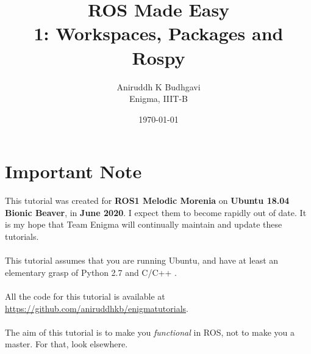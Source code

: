 \documentclass{article}
\title{ROS Made Easy \\1: Workspaces, Packages and Rospy}
\date{\today}
\author{Aniruddh K Budhgavi \\Enigma, IIIT-B}
\begin{document}
    \maketitle
    \section{Important Note}
    This tutorial was created for \textbf{ROS1 Melodic Morenia}
    on \textbf{Ubuntu 18.04 Bionic Beaver}, in \textbf{June 2020}.
    I expect them to become rapidly out of date. It is my hope
    that Team Enigma will continually maintain and update these tutorials.
    \\
    \\
    This tutorial assumes that you are running Ubuntu, and have at least an
    elementary grasp of Python 2.7 and C/C++ .
    \\
    \\
    All the code for this tutorial is available at \url{https://github.com/aniruddhkb/enigmatutorials}.
    \\
    \\
    The aim of this tutorial is to make you \emph{functional} in ROS, not to make you a master. For 
    that, look elsewhere.
\end{document}
